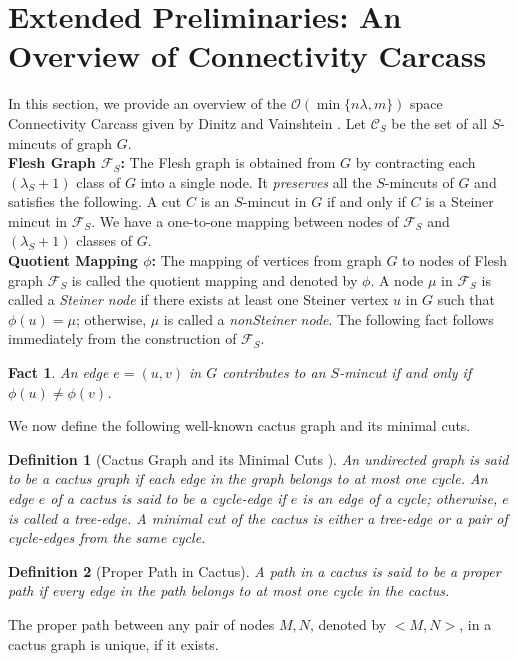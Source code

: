 \documentclass[letterpaper,11pt]{article}
\newtheorem{fact}{Fact}[]
\newtheorem{definition}{Definition}[]
\begin{document}
\section{Extended Preliminaries: An Overview of Connectivity Carcass} \label{sec : extended preliminaries}


In this section, we provide an overview of the ${\mathcal O}(\min\{n\lambda,m\})$ space Connectivity Carcass given by Dinitz and Vainshtein \cite{DBLP:conf/stoc/DinitzV94, DBLP:conf/soda/DinitzV95, DBLP:journals/siamcomp/DinitzV00}. Let ${\mathcal C}_S$ be the set of all $S$-mincuts of graph $G$.\\

\noindent
\textbf{Flesh Graph ${\mathcal F}_S$:} The Flesh graph is obtained from $G$ by contracting each $(\lambda_S+1)$ class of $G$ into a single node. It \textit{preserves} all the $S$-mincuts of $G$ and satisfies the following. A cut $C$ is an $S$-mincut in $G$ if and only if $C$ is a Steiner mincut in ${\mathcal F}_S$. We have a one-to-one mapping between nodes of ${\mathcal F}_S$ and $(\lambda_S+1)$ classes of $G$. \\



 
\noindent
\textbf{Quotient Mapping $\phi$:} The mapping of vertices from graph $G$ to nodes of Flesh graph ${\mathcal F}_S$ is called the quotient mapping and denoted by $\phi$.
A node $\mu$ in ${\mathcal F}_S$ is called a \textit{Steiner node} if there exists at least one Steiner vertex $u$ in $G$ such that $\phi(u)=\mu$; otherwise, $\mu$ is called a \textit{nonSteiner node}. The following fact follows immediately from the construction of ${\mathcal F}_S$.
\begin{fact} \label{fact : quotient mapping}
    An edge $e=(u,v)$ in $G$ contributes to an $S$-mincut if and only if $\phi(u)\ne \phi(v)$. \end{fact}
We now define the following well-known cactus graph  and its minimal cuts.
\begin{definition}[Cactus Graph and its Minimal Cuts \cite{dinitz1976structure, DBLP:journals/siamcomp/DinitzV00}] \label{def : cactus and minimal cuts}
    An undirected graph is said to be a cactus graph if each edge in the graph belongs to at most one cycle. 
    An edge $e$ of a cactus is said to be a cycle-edge if $e$ is an edge of a cycle; otherwise, $e$ is called a tree-edge. A minimal cut of the cactus is either a tree-edge or a pair of cycle-edges from the same cycle.
\end{definition}
\begin{definition} [Proper Path in Cactus]
    A path in a cactus is said to be a proper path if every edge in the path belongs to at most one cycle in the cactus.
\end{definition}
The proper path between any pair of nodes $M, N$, denoted by $<M, N>$, in a cactus graph is unique, if it exists. \\
\end{document}
